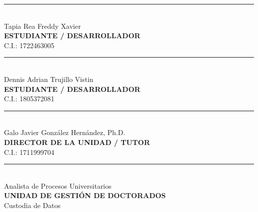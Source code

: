 \vspace{1.5cm}

\noindent
\begin{minipage}[t]{0.45\linewidth}
    \centering
    \rule{5.8cm}{0.4pt} \\[0.2cm]
    Tapia Rea Freddy Xavier \\
    \textbf{ESTUDIANTE / DESARROLLADOR} \\
    C.I.: 1722463005
\end{minipage}%
\hfill
\begin{minipage}[t]{0.45\linewidth}
    \centering
    \rule{5.8cm}{0.4pt} \\[0.2cm]
    Dennis Adrian Trujillo Vistin \\
    \textbf{ESTUDIANTE / DESARROLLADOR} \\
    C.I.: 1805372081
\end{minipage}

\vspace{1.8cm}

\noindent
\begin{minipage}[t]{0.45\linewidth}
    \centering
    \rule{5.8cm}{0.4pt} \\[0.2cm]
    Galo Javier González Hernández, Ph.D. \\
    \textbf{DIRECTOR DE LA UNIDAD / TUTOR} \\
    C.I.: 1711999704
\end{minipage}%
\hfill
\begin{minipage}[t]{0.45\linewidth}
    \centering
    \rule{5.8cm}{0.4pt} \\[0.2cm]
    Analista de Procesos Universitarios \\
    \textbf{UNIDAD DE GESTIÓN DE DOCTORADOS} \\
    Custodia de Datos
\end{minipage}

\newpage
